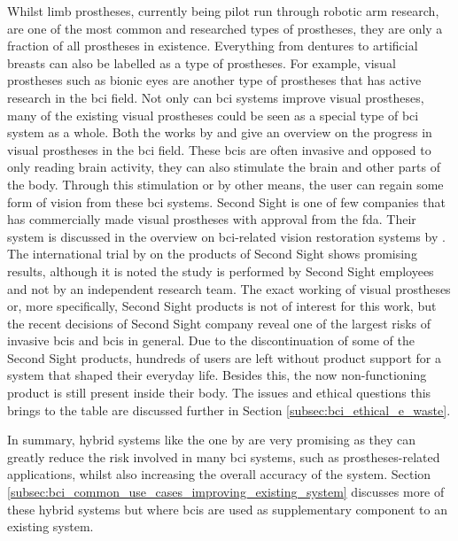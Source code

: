 Whilst limb prostheses, currently being pilot run through robotic arm research, are one of the most common and researched types of prostheses, they are only a fraction of all prostheses in existence.
Everything from dentures to artificial breasts can also be labelled as a type of prostheses.
For example, visual prostheses such as bionic eyes are another type of prostheses that has active research in the \gls{bci} field.
Not only can \gls{bci} systems improve visual prostheses, many of the existing visual prostheses could be seen as a special type of \gls{bci} system as a whole.
Both the works by \citet{bci_blind_assist_review} and \citet{bci_vision_assist_review} give an overview on the progress in visual prostheses in the \gls{bci} field.
These \glspl{bci} are often invasive and opposed to only reading brain activity, they can also stimulate the brain and other parts of the body.
Through this stimulation or by other means, the user can regain some form of vision from these \gls{bci} systems.
Second Sight is one of few companies that has commercially made visual prostheses with approval from the \gls{fda}.
Their system is discussed in the overview on \gls{bci}-related vision restoration systems by \citet{bci_vision_assist_review}.
The international trial by \citet{second_sight_trial} on the products of Second Sight shows promising results, although it is noted the study is performed by Second Sight employees and not by an independent research team.
The exact working of visual prostheses or, more specifically, Second Sight products is not of interest for this work, but the recent decisions of Second Sight company reveal one of the largest risks of invasive \glspl{bci} and \glspl{bci} in general.
Due to the discontinuation of some of the Second Sight products, hundreds of users are left without product support for a system that shaped their everyday life.
Besides this, the now non-functioning product is still present inside their body.
The issues and ethical questions this brings to the table are discussed further in Section \ref{subsec:bci_ethical_e_waste}.


In summary, hybrid systems like the one by \citet{bci_mi_robotic_arm_collision_avoidance} are very promising as they can greatly reduce the risk involved in many \gls{bci} systems, such as prostheses-related applications, whilst also increasing the overall accuracy of the system.
Section \ref{subsec:bci_common_use_cases_improving_existing_system} discusses more of these hybrid systems but where \glspl{bci} are used as supplementary component to an existing system.


